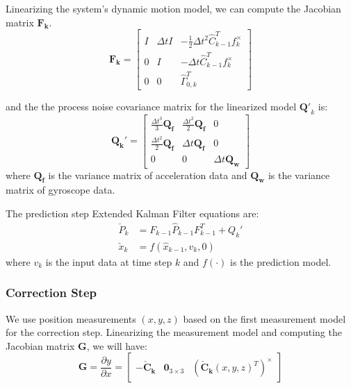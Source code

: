 \documentclass[letterpaper, 10 pt, conference]{ieeeconf}  %
\newcommand{\rom}[1]{\uppercase\expandafter{\romannumeral #1\relax}}
\begin{document}
Linearizing the system's dynamic motion model, we can compute the Jacobian matrix $\bm{F_k}$. 
\begin{equation}
\renewcommand\arraystretch{1.7}
\bm{F_k}=\begin{bmatrix}
 I   & \Delta tI & -\frac{1}{2} \Delta t^2 \hat{C}_{k-1}^T f_k^{\times}   \\
 0   & I         & -\Delta t \hat{C}_{k-1}^T f_k^{\times}   \\
 0   & 0         & \hat{\Gamma}^T_{0,k}
\end{bmatrix}
\end{equation}

and the the process noise covariance matrix for the linearized model $\bm{Q'}_k$ is:
\begin{equation}
\renewcommand\arraystretch{1.7}
\bm{Q_k'} = \begin{bmatrix}
\frac{\Delta t^3}{3} \bm{Q_f}   & \frac{\Delta t^2}{2} \bm{Q_f}  &0 \\
\frac{\Delta t^2}{2} \bm{Q_f}   & \Delta t \bm{Q_f}              &0 \\
0                           &  0                & \Delta t\bm{Q_w}    
\end{bmatrix}
\end{equation}
where $\bm{Q_f}$ is the variance matrix of acceleration data and $\bm{Q_w}$ is the variance matrix of gyroscope data.

The prediction step Extended Kalman Filter equations are:
\begin{equation}
\begin{split}
\check{P}_k &= F_{k-1}\hat{P}_{k-1}F_{k-1}^T+Q_k'  \\
\check{x}_k &= f(\hat{x}_{k-1},v_k,0)
\end{split}
\end{equation}
where $v_k$ is the input data at time step $k$ and $f(\cdot)$ is the prediction model.
\subsubsection{Correction Step \rom{1}}
We use position measurements $(x,y,z)$ based on the first measurement model for the correction step. Linearizing the measurement model and computing the Jacobian matrix $\bm{G}$, we will have:
\begin{equation}
\bm{G}=\frac{\partial y}{\partial x}=\begin{bmatrix}
-\bm{\check{C}_k}  & \bm{0}_{3\times 3} & (\bm{\check{C}_k}(x, y ,z)^T)^{\times} 
\end{bmatrix}
\end{equation} 
\end{document}
